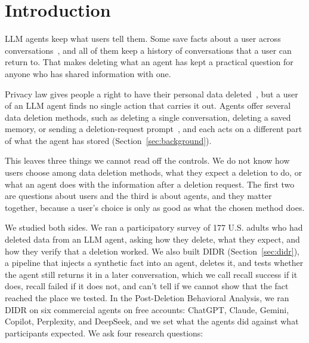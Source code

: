 \section{Introduction}
\label{sec:intro}

LLM agents keep what users tell them. Some save facts about a user across conversations~\cite{chen2026relational,zhang2025understanding}, and all of them keep a history of conversations that a user can return to. That makes deleting what an agent has kept a practical question for anyone who has shared information with one.

Privacy law gives people a right to have their personal data deleted~\cite{gdpr2016,ccpa2018}, but a user of an LLM agent finds no single action that carries it out. Agents offer several data deletion methods, such as deleting a single conversation, deleting a saved memory, or sending a deletion-request prompt~\cite{li2026privacy}, and each acts on a different part of what the agent has stored (Section~\ref{sec:background}).

This leaves three things we cannot read off the controls. We do not know how users choose among data deletion methods, what they expect a deletion to do, or what an agent does with the information after a deletion request. The first two are questions about users and the third is about agents, and they matter together, because a user's choice is only as good as what the chosen method does.

We studied both sides. We ran a participatory survey of 177 U.S. adults who had deleted data from an LLM agent, asking how they delete, what they expect, and how they verify that a deletion worked. We also built DIDR (Section~\ref{sec:didr}), a pipeline that injects a synthetic fact into an agent, deletes it, and tests whether the agent still returns it in a later conversation, which we call recall success if it does, recall failed if it does not, and can't tell if we cannot show that the fact reached the place we tested. In the Post-Deletion Behavioral Analysis, we ran DIDR on six commercial agents on free accounts: ChatGPT, Claude, Gemini, Copilot, Perplexity, and DeepSeek, and we set what the agents did against what participants expected. We ask four research questions:



